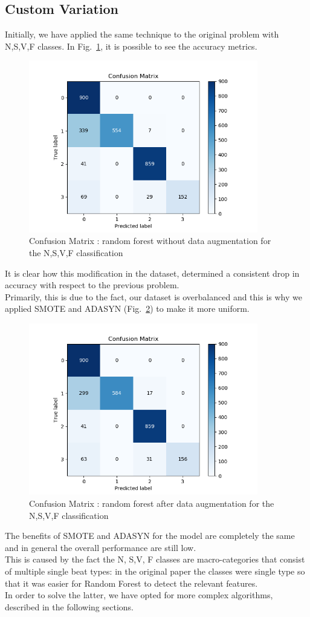 \documentclass[LaM,binding=0.6cm]{sapthesis}
\begin{document}
\subsection{Custom Variation}
Initially, we have applied the same technique to the original problem with N,S,V,F classes. In Fig.~\ref{fig:rf3}, it is possible to see the accuracy metrics.
\begin{figure}[H]  \centering
    \includegraphics[width=100mm,scale=0.7]{random-forest-no-aug.png}
    \caption{Confusion Matrix : random forest without data augmentation for the N,S,V,F classification}
    \label{fig:rf3}
\end{figure}
It is clear how this modification in the dataset, determined a consistent drop in accuracy with respect to the previous problem.\\Primarily, this is due to the fact, our dataset is overbalanced and this is why we applied SMOTE and ADASYN (Fig.~\ref{fig:rf4}) to make it more uniform.
\begin{figure}[H]  \centering
    \includegraphics[width=100mm,scale=0.7]{random-forest-smote.png}
    \caption{Confusion Matrix : random forest after data augmentation for the N,S,V,F classification}
    \label{fig:rf4}
\end{figure}
The benefits of SMOTE and ADASYN for the model are completely the same and in general the overall performance are still low.\\This is caused by the fact the N, S,V, F classes are macro-categories that consist of multiple single beat types: in the original paper the classes were single type so that it was easier for Random Forest to detect the relevant features.\\In order to solve the latter, we have opted for more complex algorithms, described in the following sections.
\end{document}
